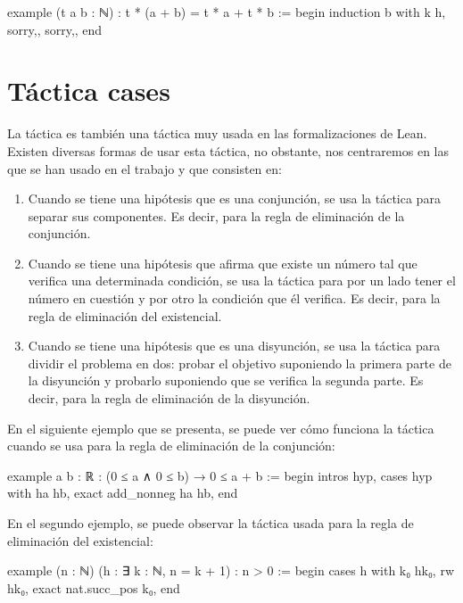 \begin{leancode}
example (t a b : ℕ) : t * (a + b) = t * a + t * b :=
begin
  induction b with k h,
  {sorry,},
  {sorry,},
end
\end{leancode}

\section{Táctica cases}

La táctica  es también una táctica muy usada en
las formalizaciones de Lean. Existen diversas formas de usar esta
táctica, no obstante, nos centraremos en las que se han usado en el
trabajo y que consisten en:
\begin{enumerate}
\item Cuando se tiene una hipótesis que es una conjunción, se usa la
  táctica  para separar sus componentes. Es decir,
  para la regla de eliminación de la conjunción.

\item Cuando se tiene una hipótesis que afirma que existe un número tal
  que verifica una determinada condición, se usa la táctica
   para por un lado tener el número en cuestión y
  por otro la condición que él verifica. Es decir, para la regla de
  eliminación del existencial.

\item Cuando se tiene una hipótesis que es una disyunción, se usa la
  táctica  para dividir el problema en dos:
  probar el objetivo suponiendo la primera parte de la disyunción y
  probarlo suponiendo que se verifica la segunda parte. Es decir, para
  la regla de eliminación de la disyunción.
\end{enumerate}

En el siguiente ejemplo que se presenta, se puede ver cómo funciona la
táctica  cuando se usa para la regla de
eliminación de la conjunción:

\begin{leancode}
example {a b : ℝ} : (0 ≤ a ∧ 0 ≤ b) → 0 ≤ a + b :=
begin
  intros hyp,
  cases hyp with ha hb,
  exact add_nonneg ha hb,
end
\end{leancode}

En el segundo ejemplo, se puede observar la táctica
 usada para la regla de eliminación del
existencial:
\begin{leancode}
example (n : ℕ) (h : ∃ k : ℕ, n = k + 1) : n > 0 :=
begin
  cases h with k₀ hk₀,
  rw hk₀,
  exact nat.succ_pos k₀,
end
\end{leancode}

